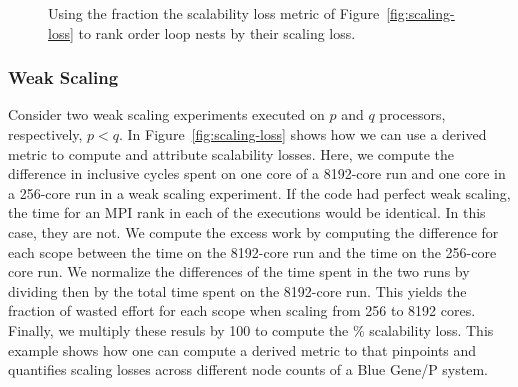 \documentclass[11pt,twoside,letterpaper]{report}
\begin{document}
\begin{figure}[t]
\caption{Using the fraction the scalability loss metric of Figure~\ref{fig:scaling-loss} to rank order loop nests by their scaling loss.}
\label{fig:scaling-loss-2}
\end{figure}


\subsubsection*{Weak Scaling}

Consider two weak scaling experiments executed on $p$ and $q$ processors, respectively, $p<q$.
In Figure~\ref{fig:scaling-loss} shows how we can use a derived metric to compute and attribute scalability losses.
Here, we compute the difference in inclusive cycles spent on one core of a 8192-core run and one core in a 256-core run in a weak scaling experiment.
If the code had perfect weak scaling, the time for an MPI rank in each of the executions would be identical. In this case, they are not.
We compute the excess work by computing the difference for each scope between the time on the 8192-core  run and the time on the 256-core core run.
We normalize the differences of the time spent in the two runs by dividing then by the total time spent on the 8192-core  run. This yields the fraction of wasted effort
for each scope when scaling from 256 to 8192 cores. Finally, we multiply these resuls by 100 to compute the \% scalability loss.
This example shows how one can compute a derived metric to that pinpoints and quantifies scaling losses across different node counts of a Blue Gene/P system.
\end{document}
